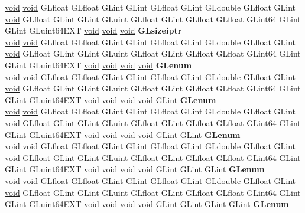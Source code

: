 \begin{DoxyCompactItemize}
\begin{tabbing}
\>\hyperlink{interfacevoid}{void} \hyperlink{interfacevoid}{void} GLfloat GLfloat GLint GLint GLfloat GLint GLdouble GLfloat GLint \hyperlink{interfacevoid}{void} GLfloat GLint GLint GLuint GLfloat GLint GLfloat GLfloat GLint64 GLint GLint GLuint64EXT \hyperlink{interfacevoid}{void} \hyperlink{interfacevoid}{void} \hyperlink{interfacevoid}{void} {\bfseries GLsizeiptr}\\
\>\hyperlink{interfacevoid}{void} \hyperlink{interfacevoid}{void} GLfloat GLfloat GLint GLint GLfloat GLint GLdouble GLfloat GLint \hyperlink{interfacevoid}{void} GLfloat GLint GLint GLuint GLfloat GLint GLfloat GLfloat GLint64 GLint GLint GLuint64EXT \hyperlink{interfacevoid}{void} \hyperlink{interfacevoid}{void} \hyperlink{interfacevoid}{void} \hyperlink{interfacevoid}{void} {\bfseries GLenum}\\
\>\hyperlink{interfacevoid}{void} \hyperlink{interfacevoid}{void} GLfloat GLfloat GLint GLint GLfloat GLint GLdouble GLfloat GLint \hyperlink{interfacevoid}{void} GLfloat GLint GLint GLuint GLfloat GLint GLfloat GLfloat GLint64 GLint GLint GLuint64EXT \hyperlink{interfacevoid}{void} \hyperlink{interfacevoid}{void} \hyperlink{interfacevoid}{void} \hyperlink{interfacevoid}{void} GLint {\bfseries GLenum}\\
\>\hyperlink{interfacevoid}{void} \hyperlink{interfacevoid}{void} GLfloat GLfloat GLint GLint GLfloat GLint GLdouble GLfloat GLint \hyperlink{interfacevoid}{void} GLfloat GLint GLint GLuint GLfloat GLint GLfloat GLfloat GLint64 GLint GLint GLuint64EXT \hyperlink{interfacevoid}{void} \hyperlink{interfacevoid}{void} \hyperlink{interfacevoid}{void} \hyperlink{interfacevoid}{void} GLint GLint {\bfseries GLenum}\\
\>\hyperlink{interfacevoid}{void} \hyperlink{interfacevoid}{void} GLfloat GLfloat GLint GLint GLfloat GLint GLdouble GLfloat GLint \hyperlink{interfacevoid}{void} GLfloat GLint GLint GLuint GLfloat GLint GLfloat GLfloat GLint64 GLint GLint GLuint64EXT \hyperlink{interfacevoid}{void} \hyperlink{interfacevoid}{void} \hyperlink{interfacevoid}{void} \hyperlink{interfacevoid}{void} GLint GLint GLint {\bfseries GLenum}\\
\>\hyperlink{interfacevoid}{void} \hyperlink{interfacevoid}{void} GLfloat GLfloat GLint GLint GLfloat GLint GLdouble GLfloat GLint \hyperlink{interfacevoid}{void} GLfloat GLint GLint GLuint GLfloat GLint GLfloat GLfloat GLint64 GLint GLint GLuint64EXT \hyperlink{interfacevoid}{void} \hyperlink{interfacevoid}{void} \hyperlink{interfacevoid}{void} \hyperlink{interfacevoid}{void} GLint GLint GLint GLint {\bfseries GLenum}\\

\end{tabbing}
\end{DoxyCompactItemize}
